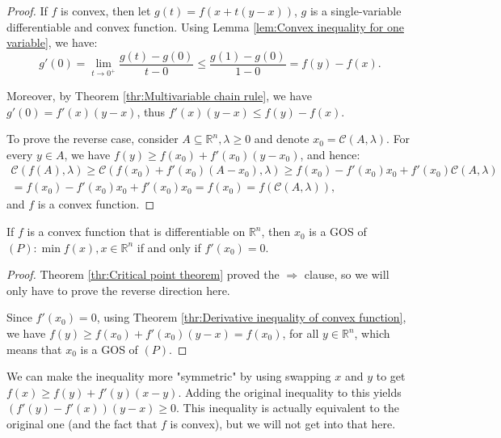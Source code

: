 \begin{proof}
  If \( f \) is convex, then let \( g(t) = f(x + t(y - x)) \), \( g \) is a
  single-variable differentiable and convex function. Using Lemma
  \ref{lem:Convex inequality for one variable}, we have:
  \[
    g'(0) = \lim_{t \to 0^{+}} \frac{g(t) - g(0)}{t - 0} \le \frac{g(1)-g(0)}{1
    - 0} = f(y) - f(x) 
  .\] 

  Moreover, by Theorem \ref{thr:Multivariable chain rule}, we have \( g'(0) =
  f'(x)(y - x) \), thus \( f'(x)(y - x) \le f(y) - f(x) \).

  To prove the reverse case, consider \( A \subseteq \mathbb{R}^{n}, \lambda \ge
  0\) and denote \(x_{0} = \mathcal{C}(A, \lambda) \). For every \( y \in A \),
  we have \( f(y) \ge f(x_{0}) + f'(x_{0})(y - x_{0}) \), and hence:
  \begin{multline*}
    \mathcal{C}(f(A), \lambda) \ge \mathcal{C}(f(x_{0}) + f'(x_{0})(A - x_{0}),
    \lambda) \ge f(x_{0}) - f'(x_{0})x_{0} + f'(x_{0})\mathcal{C}(A, \lambda)\\ =
    f(x_{0}) - f'(x_{0})x_{0} + f'(x_{0})x_{0} = f(x_{0}) = f(\mathcal{C}(A,
    \lambda)),
  \end{multline*} and \( f \) is a convex function.
\end{proof}

\begin{corollary}
\label{cor:Stationary points of convex programs are GOSes}
  If \( f \) is a convex function that is differentiable on \( \mathbb{R}^{n}
  \), then \( x_{0} \) is a GOS of \( (P): \min f(x), x \in \mathbb{R}^{n} \)
  if and only if \( f'(x_{0}) = 0 \).
\end{corollary}

\begin{proof}
  Theorem \ref{thr:Critical point theorem} proved the \( \Rightarrow \) clause,
  so we will only have to prove the reverse direction here.

  Since \( f'(x_{0}) = 0 \), using Theorem \ref{thr:Derivative inequality of
  convex function}, we have \( f(y) \ge f(x_{0}) +f'(x_{0})(y- x) = f(x_{0}) \),
  for all \( y \in \mathbb{R}^{n} \), which means that \( x_{0} \) is a GOS of
  \( (P) \).
\end{proof}


We can make the inequality more "symmetric" by using swapping \( x \) and \( y
\) to get \( f(x) \ge f(y) + f'(y)(x-y)  \). Adding the original inequality to
this yields \( (f'(y)-f'(x))(y - x)\ge 0 \). This inequality is actually
equivalent to the original one (and the fact that \( f \) is convex), but we
will not get into that here.

